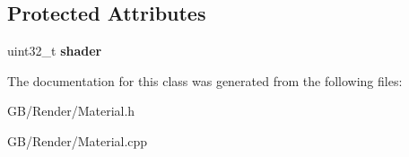 \subsection*{Protected Attributes}
\begin{DoxyCompactItemize}
\item 
\mbox{\label{class_g_b_1_1_material_a73059b669f81c41d3a7bbeaeadcdc054}} 
uint32\+\_\+t {\bfseries shader}
\end{DoxyCompactItemize}


The documentation for this class was generated from the following files\+:\begin{DoxyCompactItemize}
\item 
G\+B/\+Render/Material.\+h\item 
G\+B/\+Render/Material.\+cpp\end{DoxyCompactItemize}
